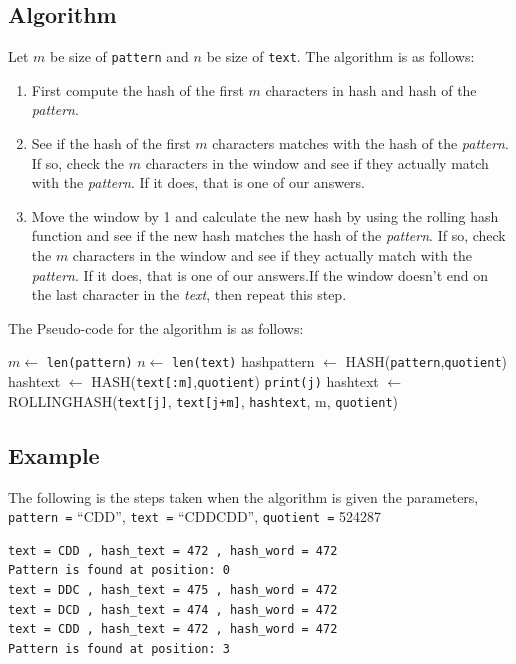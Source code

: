 \documentclass[a4paper, 12pt]{report}
\begin{document}
    \subsection{Algorithm}

    Let $m$ be size of \texttt{pattern} and $n$ be size of \texttt{text}. The algorithm is as follows:
    \begin{enumerate}
        \item First compute the hash of the first $m$ characters in hash and hash of the \textit{pattern}.
        \item See if the hash of the first $m$ characters matches with the hash of the \textit{pattern}. If so, check the $m$ characters in the window and see if they actually match with the \textit{pattern}. If it does, that is one of our answers.
        \item  Move the window by 1 and calculate the new hash by using the rolling hash function and see if the new hash matches the hash of the \textit{pattern}. If so, check the $m$ characters in the window and see if they actually match with the \textit{pattern}. If it does, that is one of our answers.If the window doesn't end on the last character in the \textit{text}, then repeat this step.
    \end{enumerate}

    The Pseudo-code for the algorithm is as follows:
    \pagebreak
    \begin{algorithm}
        \begin{algorithmic}
        \State $m \gets$ \texttt{len(pattern)}
        \State $n \gets $ \texttt{len(text)}
        \State hashpattern $\gets$ HASH(\texttt{pattern},\texttt{quotient})
        \State hashtext $\gets$ HASH(\texttt{text[:m]},\texttt{quotient})
        \State \texttt{print(j)}
        \EndIf
        \State hashtext $\gets$ ROLLINGHASH(\texttt{text[j]}, \texttt{text[j+m]}, \texttt{hashtext}, m, \texttt{quotient})
        \EndIf
        \EndFor
        
        \EndProcedure
        \end{algorithmic}
        \end{algorithm}  
    
    \subsection{Example}
    The following is the steps taken when the algorithm is given the parameters, \texttt{pattern =} ``CDD'',  \texttt{text =} ``CDDCDD'', \texttt{quotient =} 524287
\begin{verbatim}
text = CDD , hash_text = 472 , hash_word = 472
Pattern is found at position: 0
text = DDC , hash_text = 475 , hash_word = 472
text = DCD , hash_text = 474 , hash_word = 472
text = CDD , hash_text = 472 , hash_word = 472
Pattern is found at position: 3
\end{verbatim}
\end{document}
